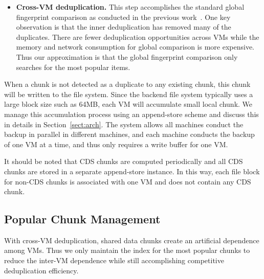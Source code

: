 \begin{itemize}
%

\item \textbf{Cross-VM deduplication.}
This step accomplishes the standard global fingerprint  comparison as conducted
in the previous work~\cite{??}.
One key observation is that the inner deduplication has removed many of the duplicates.
There are fewer deduplication opportunities across VMs while the memory and network
consumption for global comparison is more expensive.
Thus our approximation is that the global fingerprint comparison only searches for the most popular items. 
\end{itemize}

When a chunk is not detected as a duplicate to any existing chunk, this chunk will be written
to the file system. Since the backend file system typically uses a large block size such as 64MB, each VM will 
accumulate small local chunk. We manage this accumulation process using an append-store  scheme
and discuss this in details in Section~\ref{sect:arch}.
The system allows all machines conduct the backup in parallel in different machines, and each machine
conducts the backup of one VM at a time, and thus only requires a write  buffer for one VM.

It should be noted that CDS chunks are computed periodically and all CDS chunks are stored in a separate
append-store instance. In this way, each file block for non-CDS chunks is associated with one VM
and does not contain any CDS chunk. 

 \subsection{Popular Chunk Management}
With cross-VM deduplication, shared data chunks
create an artificial dependence  among VMs. 
Thus we only maintain the index for the most popular chunks to reduce the inter-VM dependence
while still accomplishing competitive deduplication efficiency. 

